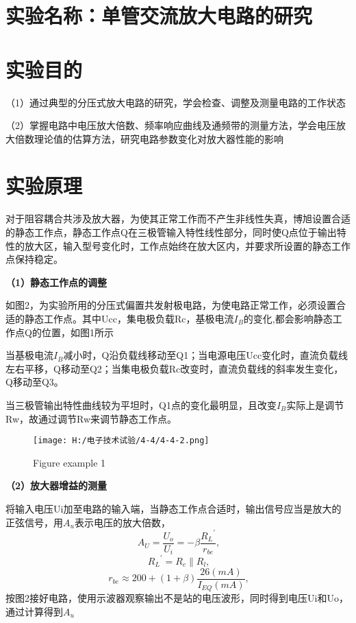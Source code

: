 \documentclass{article}
\begin{document}
	\section{ 实验名称：单管交流放大电路的研究}
    \section{ 实验目的}
     （1）通过典型的分压式放大电路的研究，学会检查、调整及测量电路的工作状态	\par
               （2）掌握电路中电压放大倍数、频率响应曲线及通频带的测量方法，学会电压放大倍数理论值的估算方法，研究电路参数变化对放大器性能的影响 \par
    \section{ 实验原理}
    对于阻容耦合共涉及放大器，为使其正常工作而不产生非线性失真，博旭设置合适的静态工作点，静态工作点Q在三极管输入特性线性部分，同时使Q点位于输出特性的放大区，输入型号变化时，工作点始终在放大区内，并要求所设置的静态工作点保持稳定。\par
    \textbf{（1）静态工作点的调整}\par
	如图2，为实验所用的分压式偏置共发射极电路，为使电路正常工作，必须设置合适的静态工作点。其中Ucc，集电极负载Rc，基极电流$I_B$的变化,都会影响静态工作点Q的位置，如图1所示\par
	当基极电流$I_B$减小时，Q沿负载线移动至Q1；当电源电压Ucc变化时，直流负载线左右平移，Q移动至Q2；当集电极负载Rc改变时，直流负载线的斜率发生变化，Q移动至Q3。\par
	当三极管输出特性曲线较为平坦时，Q1点的变化最明显，且改变$I_B$实际上是调节Rw，故通过调节Rw来调节静态工作点。\par
	\begin{figure}[h]
		\centering
		\texttt{[image: H:/电子技术试验/4-4/4-4-2.png]}
		\caption{Figure example 1} \label{fig:aa}
	\end{figure}
\newpage
	
	\textbf{（2）放大器增益的测量}\par
	将输入电压Ui加至电路的输入端，当静态工作点合适时，输出信号应当是放大的正弦信号，用$A_u$表示电压的放大倍数，
	\begin{equation*}
		\ A_U=\frac{U_o}{U_i}=-\beta\frac{{R_L}^{'}}{r_{be}},
	\end{equation*}
	\begin{equation*}
		\ {R_L}^{'}=R_c\| R_l,
	\end{equation*}
	\begin{equation*}
		\ r_{be}\approx 200+(1+\beta)\frac{26(mA)}{I_{EQ}(mA)},
	\end{equation*}
	按图2接好电路，使用示波器观察输出不是站的电压波形，同时得到电压Ui和Uo，通过计算得到$A_u$\par
\end{document}
